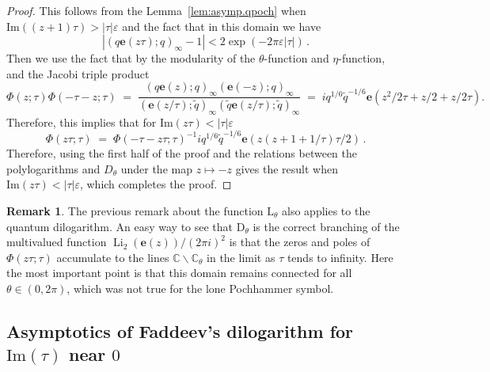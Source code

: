 \documentclass[12pt,reqno]{amsart}
\theoremstyle{definition}
\newtheorem{remark}[theorem]{Remark}
\def\BC{\mathbb C}
\def\Im{\mathrm{Im}}
\def\be{\begin{equation}}
\def\ee{\end{equation}}
\def\e{\mathbf e}
\renewcommand{\=}{\;=\;}
\newcommand{\tq}{\widetilde q}
\newcommand{\Li}{\operatorname{Li}}
\begin{document}
\begin{proof}
This follows from the Lemma~\ref{lem:asymp.qpoch} when $\Im((z+1)\tau)>|\tau|\varepsilon$ and the fact that in this domain we have
\be
  |(q\e(z\tau);q)_{\infty}-1|<2\exp(-2\pi\varepsilon|\tau|)\,.
\ee
Then we use the fact that by the modularity of the $\theta$-function and $\eta$-function, and the Jacobi triple product
\be
  \Phi(z;\tau)\Phi(-\tau-z;\tau)
  \=
  \frac{(q\e(z);q)_{\infty}(\e(-z);q)_{\infty}}{(\e(z/\tau);\tq)_{\infty}(\tq\e(z/\tau);\tq)_{\infty}}
  \=
  iq^{1/6}\tq^{-1/6}\e(z^2/2\tau+z/2+z/2\tau).
\ee
Therefore, this implies that for $\Im(z\tau)<|\tau|\varepsilon$
\be
  \Phi(z\tau;\tau)
  \=
  \Phi(-\tau-z\tau;\tau)^{-1}
  iq^{1/6}\tq^{-1/6}\e(z(z+1+1/\tau)\tau/2)\,.
\ee
Therefore, using the first half of the proof and the relations between the polylogarithms and $D_{\theta}$ under the map $z\mapsto-z$ gives the result when $\Im(z\tau)<|\tau|\varepsilon$, which completes the proof.
\end{proof}

\begin{remark}
The previous remark about the function $\mathrm{L}_{\theta}$ also applies to the quantum dilogarithm. An easy way to see that $\mathrm{D}_{\theta}$ is the correct branching of the multivalued function $\Li_{2}(\e(z))/(2\pi i)^2$ is that the zeros and poles of $\Phi(z\tau;\tau)$ accumulate to the lines $\BC\backslash\BC_{\theta}$ in the limit as $\tau$ tends to infinity. Here the most important point is that this domain remains connected for all $\theta\in(0,2\pi)$, which was not true for the lone Pochhammer symbol.
\end{remark}

\subsection{\texorpdfstring{Asymptotics of Faddeev's dilogarithm for $\Im(\tau)$ near $0$}{Asymptotics of Faddeev's dilogarithm for Im(tau) near 0}}
\end{document}
